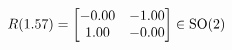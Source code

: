 \documentclass[preview]{standalone}
\begin{document}
\begin{align*}
\special{dvisvgm:raw <g id='unique000'>}R(1.57) = \begin{bmatrix} -0.00 & -1.00 \\ 1.00 & -0.00 \end{bmatrix} \in \text{SO}(2)\special{dvisvgm:raw </g>}
\end{align*}
\end{document}
